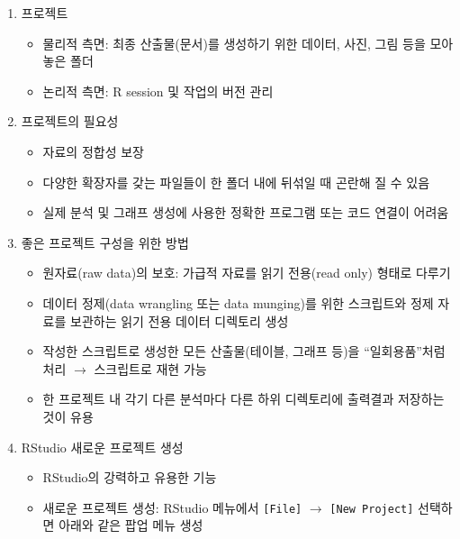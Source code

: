 \documentclass[
  11pt,
]{krantz}
\providecommand{\tightlist}{%
  \setlength{\itemsep}{0pt}\setlength{\parskip}{0pt}}
\begin{document}
\begin{enumerate}
\def\labelenumi{\arabic{enumi}.}
\tightlist
\item
  프로젝트

  \begin{itemize}
  \tightlist
  \item
    물리적 측면: 최종 산출물(문서)를 생성하기 위한 데이터, 사진, 그림 등을 모아 놓은 폴더
  \item
    논리적 측면: R session 및 작업의 버전 관리
  \end{itemize}
\item
  프로젝트의 필요성

  \begin{itemize}
  \tightlist
  \item
    자료의 정합성 보장
  \item
    다양한 확장자를 갖는 파일들이 한 폴더 내에 뒤섞일 때 곤란해 질 수 있음
  \item
    실제 분석 및 그래프 생성에 사용한 정확한 프로그램 또는 코드 연결이 어려움
  \end{itemize}
\item
  좋은 프로젝트 구성을 위한 방법

  \begin{itemize}
  \tightlist
  \item
    원자료(raw data)의 보호: 가급적 자료를 읽기 전용(read only) 형태로 다루기
  \item
    데이터 정제(data wrangling 또는 data munging)를 위한 스크립트와 정제 자료를 보관하는 읽기 전용 데이터 디렉토리 생성
  \item
    작성한 스크립트로 생성한 모든 산출물(테이블, 그래프 등)을 ``일회용품''처럼 처리 \(\rightarrow\) 스크립트로 재현 가능
  \item
    한 프로젝트 내 각기 다른 분석마다 다른 하위 디렉토리에 출력결과 저장하는 것이 유용
  \end{itemize}
\item
  RStudio 새로운 프로젝트 생성

  \begin{itemize}
  \tightlist
  \item
    RStudio의 강력하고 유용한 기능
  \item
    새로운 프로젝트 생성: RStudio 메뉴에서 \texttt{{[}File{]}} \(\rightarrow\) \texttt{{[}New\ Project{]}} 선택하면 아래와 같은 팝업 메뉴 생성
  \end{itemize}
\end{enumerate}

\footnotesize
\end{document}
